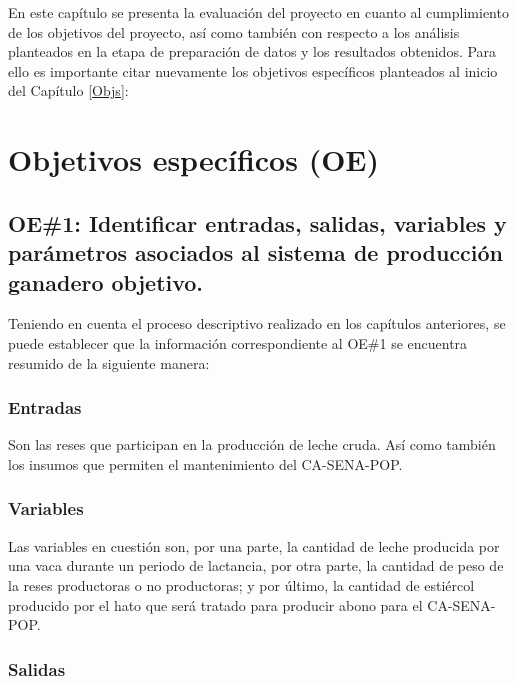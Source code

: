 
En este capítulo se presenta la evaluación del proyecto en cuanto al cumplimiento de los objetivos del proyecto, así como también con respecto a los análisis planteados en la etapa de preparación de datos y los resultados obtenidos. Para ello es importante citar nuevamente los objetivos específicos planteados al inicio del Capítulo \ref{Objs}:

\section{Objetivos específicos (OE)}\label{objesp}
\subsection{OE\#1: Identificar entradas, salidas, variables y parámetros asociados al sistema de producción ganadero objetivo.}

Teniendo en cuenta el proceso descriptivo realizado en los capítulos anteriores, se puede establecer que la información correspondiente al OE\#1 se encuentra resumido de la siguiente manera:

\subsubsection{Entradas}
Son las reses que participan en la producción de leche cruda. Así como también los insumos  que permiten el mantenimiento del CA-SENA-POP.

\subsubsection{Variables}
Las variables en cuestión son, por una parte, la cantidad de leche producida por una vaca durante un periodo de lactancia, por otra parte, la cantidad de peso de la reses productoras o no productoras; y por último, la cantidad de estiércol producido por el hato que será tratado para producir abono para el CA-SENA-POP.

\subsubsection{Salidas}

